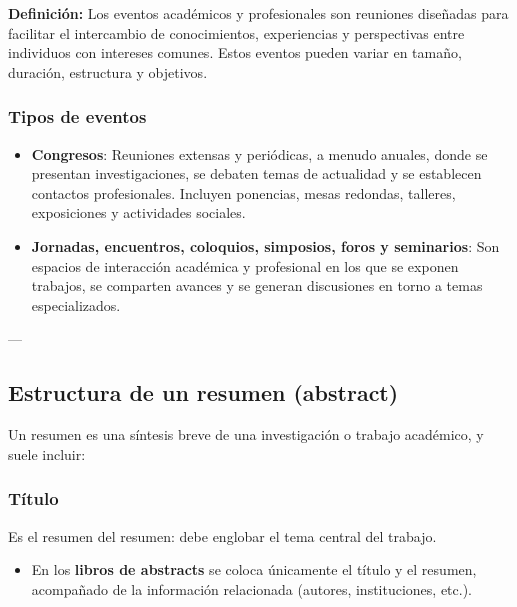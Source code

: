 \documentclass{article}
\begin{document}
\textbf{Definición:}  
Los eventos académicos y profesionales son reuniones diseñadas para facilitar el intercambio de conocimientos, experiencias y perspectivas entre individuos con intereses comunes. Estos eventos pueden variar en tamaño, duración, estructura y objetivos. \vspace{0.5cm}

\subsubsection{Tipos de eventos} \vspace{0.3cm}

\begin{itemize}
	\item \textbf{Congresos}: Reuniones extensas y periódicas, a menudo anuales, donde se presentan investigaciones, se debaten temas de actualidad y se establecen contactos profesionales. Incluyen ponencias, mesas redondas, talleres, exposiciones y actividades sociales. 
	\item \textbf{Jornadas, encuentros, coloquios, simposios, foros y seminarios}: Son espacios de interacción académica y profesional en los que se exponen trabajos, se comparten avances y se generan discusiones en torno a temas especializados.
\end{itemize}

---

\subsection{Estructura de un resumen (abstract)} \vspace{0.5cm}

Un resumen es una síntesis breve de una investigación o trabajo académico, y suele incluir:  

\subsubsection{Título}  
Es el resumen del resumen: debe englobar el tema central del trabajo.  

\begin{itemize}
	\item En los \textbf{libros de abstracts} se coloca únicamente el título y el resumen, acompañado de la información relacionada (autores, instituciones, etc.).
\end{itemize}
\end{document}
